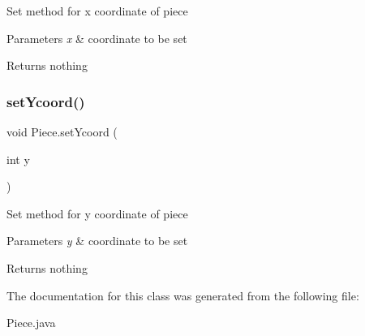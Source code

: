 Set method for x coordinate of piece 
\begin{DoxyParams}{Parameters}
{\em x} & coordinate to be set \\
\hline
\end{DoxyParams}
\begin{DoxyReturn}{Returns}
nothing 
\end{DoxyReturn}
\mbox{\label{class_piece_a6618c10a34b92fbe2d99d932475f8321}} 
\subsubsection{\texorpdfstring{setYcoord()}{setYcoord()}}
{\footnotesize\ttfamily void Piece.\+set\+Ycoord (\begin{DoxyParamCaption}\item[{int}]{y }\end{DoxyParamCaption})\hspace{0.3cm}{\ttfamily [inline]}}

Set method for y coordinate of piece 
\begin{DoxyParams}{Parameters}
{\em y} & coordinate to be set \\
\hline
\end{DoxyParams}
\begin{DoxyReturn}{Returns}
nothing 
\end{DoxyReturn}


The documentation for this class was generated from the following file\+:\begin{DoxyCompactItemize}
\item 
Piece.\+java\end{DoxyCompactItemize}
